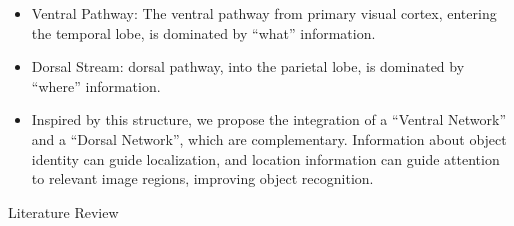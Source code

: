 \documentclass[landscape,paperwidth=46.8in,paperheight=33.1in,fontscale=0.292]{baposter}
\begin{document}
\begin{poster}
{    \begin{itemize}
        \item Ventral Pathway:  The ventral pathway from primary visual cortex, entering the temporal lobe, is dominated by ``what'' information.
        \item Dorsal Stream: dorsal pathway, into the parietal lobe, is dominated by ``where'' information.
        \item Inspired by this structure, we propose the integration of
a ``Ventral Network'' and a ``Dorsal Network'', which are
complementary. Information about object identity can guide 
localization, and location information can guide attention to relevant
image regions, improving object recognition.
    \end{itemize}  
}

                                                 Literature Review



\end{poster}
\end{document}
